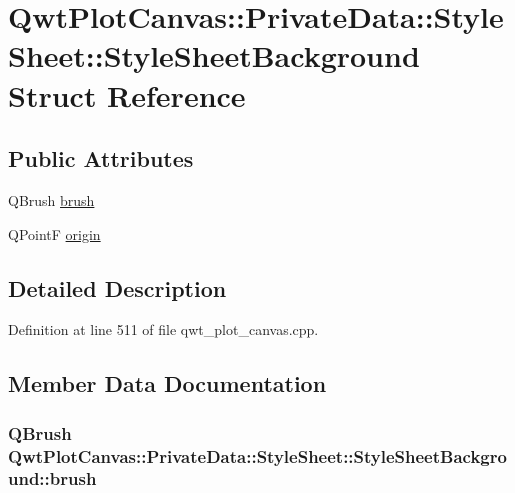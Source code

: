 \hypertarget{struct_qwt_plot_canvas_1_1_private_data_1_1_style_sheet_1_1_style_sheet_background}{\section{Qwt\-Plot\-Canvas\-:\-:Private\-Data\-:\-:Style\-Sheet\-:\-:Style\-Sheet\-Background Struct Reference}
\label{struct_qwt_plot_canvas_1_1_private_data_1_1_style_sheet_1_1_style_sheet_background}
}
\subsection*{Public Attributes}
\begin{DoxyCompactItemize}
\item 
Q\-Brush \hyperlink{struct_qwt_plot_canvas_1_1_private_data_1_1_style_sheet_1_1_style_sheet_background_aebb97029d83cda9c06d2314d524c2df7}{brush}
\item 
Q\-Point\-F \hyperlink{struct_qwt_plot_canvas_1_1_private_data_1_1_style_sheet_1_1_style_sheet_background_a7c79042a0846278ff1923d67b82ae2dd}{origin}
\end{DoxyCompactItemize}


\subsection{Detailed Description}


Definition at line 511 of file qwt\-\_\-plot\-\_\-canvas.\-cpp.



\subsection{Member Data Documentation}
\hypertarget{struct_qwt_plot_canvas_1_1_private_data_1_1_style_sheet_1_1_style_sheet_background_aebb97029d83cda9c06d2314d524c2df7}{
\subsubsection[{brush}]{\setlength{\rightskip}{0pt plus 5cm}Q\-Brush Qwt\-Plot\-Canvas\-::\-Private\-Data\-::\-Style\-Sheet\-::\-Style\-Sheet\-Background\-::brush}}\label{struct_qwt_plot_canvas_1_1_private_data_1_1_style_sheet_1_1_style_sheet_background_aebb97029d83cda9c06d2314d524c2df7}


